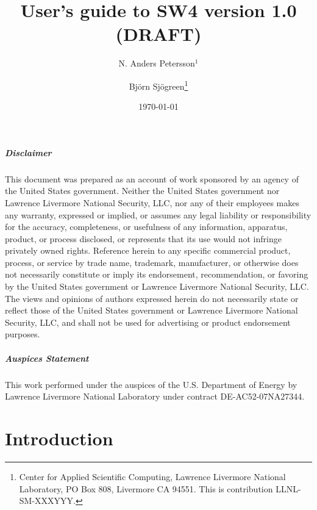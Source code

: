 \documentclass[11pt]{report}
\begin{document}
\title{\LARGE User's guide to SW4 version 1.0 (DRAFT)} 

\author{ N. Anders Petersson$^1$ \and Bj\"orn Sj\"ogreen\thanks{Center for Applied Scientific
     Computing, Lawrence Livermore National Laboratory, PO Box 808, Livermore CA 94551. This is
     contribution LLNL-SM-XXXYYY.}}
\date{\today} 
\maketitle
\pagestyle{myheadings}


\pagebreak
\paragraph {Disclaimer} 
This document was prepared as an account of work sponsored by an agency of the United States
government. Neither the United States government nor Lawrence Livermore National Security, LLC, nor
any of their employees makes any warranty, expressed or implied, or assumes any legal liability or
responsibility for the accuracy, completeness, or usefulness of any information, apparatus, product,
or process disclosed, or represents that its use would not infringe privately owned
rights. Reference herein to any specific commercial product, process, or service by trade name,
trademark, manufacturer, or otherwise does not necessarily constitute or imply its endorsement,
recommendation, or favoring by the United States government or Lawrence Livermore National Security,
LLC. The views and opinions of authors expressed herein do not necessarily state or reflect those of
the United States government or Lawrence Livermore National Security, LLC, and shall not be used for
advertising or product endorsement purposes. 

\paragraph{Auspices Statement}
This work performed under the auspices of the U.S. Department of Energy by Lawrence Livermore
National Laboratory under contract DE-AC52-07NA27344.
\tableofcontents


\chapter{Introduction}
\end{document}
